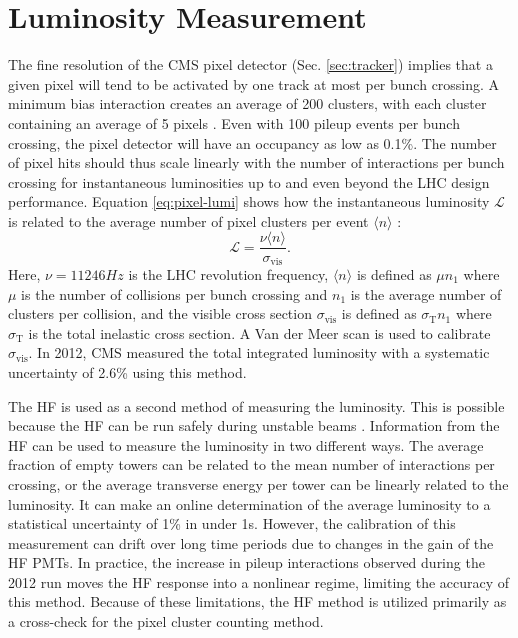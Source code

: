 \documentclass[12pt]{thesis}  %
\begin{document}
\section{Luminosity Measurement}

The fine resolution of the CMS pixel detector (Sec. \ref{sec:tracker}) implies that a given pixel will tend to be activated by one track at most per bunch crossing. A minimum bias interaction creates an average of 200 clusters, with each cluster containing an average of 5 pixels \cite{CMS-PAS-LUM-12-001}. Even with 100 pileup events per bunch crossing, the pixel detector will have an occupancy as low as 0.1\%. The number of pixel hits should thus scale linearly with the number of interactions per bunch crossing for instantaneous luminosities up to and even beyond the LHC design performance. Equation \eqref{eq:pixel-lumi} shows how the instantaneous luminosity $\mathcal{L}$ is related to the average number of pixel clusters per event $\langle n \rangle$ \cite{CMS-PAS-LUM-13-001}:
\begin{equation} \label{eq:pixel-lumi}
\mathcal{L} = \frac{\nu \langle n \rangle}{\sigma_\text{vis}}.
\end{equation}
Here, $\nu = 11246\unit{Hz}$ is the LHC revolution frequency, $\langle n \rangle$ is defined as $\mu n_{1}$ where $\mu$ is the number of collisions per bunch crossing and $n_{1}$ is the average number of clusters per collision, and the visible cross section $\sigma_\text{vis}$ is defined as $\sigma_\text{T} n_{1}$ where $\sigma_\text{T}$ is the total inelastic cross section. A Van der Meer scan is used to calibrate $\sigma_\text{vis}$. In 2012, CMS measured the total integrated luminosity with a systematic uncertainty of 2.6\% using this method.

The HF is used as a second method of measuring the luminosity. This is possible because the HF can be run safely during unstable beams \cite{CMS-PAS-LUM-13-001}. Information from the HF can be used to measure the luminosity in two different ways. The average fraction of empty towers can be related to the mean number of interactions per crossing, or the average transverse energy per tower can be linearly related to the luminosity. It can make an online determination of the average luminosity to a statistical uncertainty of 1\% in under 1\unit{s}. However, the calibration of this measurement can drift over long time periods due to changes in the gain of the HF PMTs. In practice, the increase in pileup interactions observed during the 2012 run moves the HF response into a nonlinear regime, limiting the accuracy of this method. Because of these limitations, the HF method is utilized primarily as a cross-check for the pixel cluster counting method.
\end{document}

